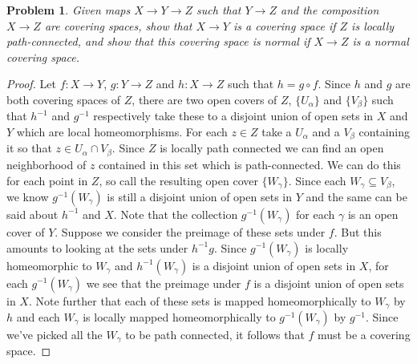 \documentclass{article}
\newtheorem{problem}{Problem}
\begin{document}
\begin{problem}
Given maps $X \to Y \to Z$ such that $Y \to Z$ and the composition $X \to Z$ are covering spaces, show that $X \to Y$ is a covering space if $Z$ is locally path-connected, and show that this covering space is normal if $X \to Z$ is a normal covering space.
\end{problem}
\begin{proof}
Let $f : X \to Y$, $g : Y \to Z$ and $h : X \to Z$ such that $h = g \circ f$. Since $h$ and $g$ are both covering spaces of $Z$, there are two open covers of $Z$, $\{ U_{\alpha} \}$ and $\{ V_{\beta} \}$ such that $h^{-1}$ and $g^{-1}$ respectively take these to a disjoint union of open sets in $X$ and $Y$ which are local homeomorphisms. For each $z \in Z$ take a $U_{\alpha}$ and a $V_{\beta}$ containing it so that $z \in U_{\alpha} \cap V_{\beta}$. Since $Z$ is locally path connected we can find an open neighborhood of $z$ contained in this set which is path-connected. We can do this for each point in $Z$, so call the resulting open cover $\{ W_{\gamma} \}$. Since each $W_{\gamma} \subseteq V_{\beta}$, we know $g^{-1}(W_{\gamma})$ is still a disjoint union of open sets in $Y$ and the same can be said about $h^{-1}$ and $X$. Note that the collection $g^{-1}(W_{\gamma})$ for each $\gamma$ is an open cover of $Y$. Suppose we consider the preimage of these sets under $f$. But this amounts to looking at the sets under $h^{-1}g$. Since $g^{-1}(W_{\gamma})$ is locally homeomorphic to $W_{\gamma}$ and $h^{-1}(W_{\gamma})$ is a disjoint union of open sets in $X$, for each $g^{-1}(W_{\gamma})$ we see that the preimage under $f$ is a disjoint union of open sets in $X$. Note further that each of these sets is mapped homeomorphically to $W_{\gamma}$ by $h$ and each $W_{\gamma}$ is locally mapped homeomorphically to $g^{-1}(W_{\gamma})$ by $g^{-1}$. Since we've picked all the $W_{\gamma}$ to be path connected, it follows that $f$ must be a covering space.
\end{proof}
\end{document}
